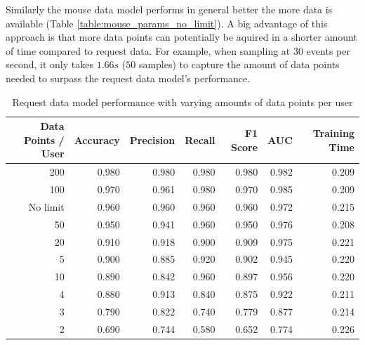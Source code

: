 \documentclass[
    fontsize=12pt,
    headings=small,
    parskip=half,           %
    bibliography=totoc,
    numbers=noenddot,       %
    open=any,               %
    final,                   %
    table
]{scrreprt}
\begin{document}
Similarly the mouse data model performs in general better the more data is available (Table \ref{table:mouse_params_no_limit}). A big advantage of this approach is that more data points can potentially be aquired in a shorter amount of time compared to request data. For example, when sampling at $30$ events per second, it only takes $1.66s$ ($50$ samples) to capture the amount of data points needed to surpass the request data model's performance.


\begin{table}
    \begin{center}
        \begin{tabular}{rrrrrrr}
            \toprule
            Data Points / User & Accuracy & Precision & Recall & F1 Score & AUC & Training Time \\
            \midrule
            200 & 0.980 & 0.980 & 0.980 & 0.980 & 0.982 & 0.209 \\
            100 & 0.970 & 0.961 & 0.980 & 0.970 & 0.985 & 0.209 \\
            No limit & 0.960 & 0.960 & 0.960 & 0.960 & 0.972 & 0.215 \\
            50 & 0.950 & 0.941 & 0.960 & 0.950 & 0.976 & 0.208 \\
            20 & 0.910 & 0.918 & 0.900 & 0.909 & 0.975 & 0.221 \\
            5 & 0.900 & 0.885 & 0.920 & 0.902 & 0.945 & 0.220 \\
            10 & 0.890 & 0.842 & 0.960 & 0.897 & 0.956 & 0.220 \\
            4 & 0.880 & 0.913 & 0.840 & 0.875 & 0.922 & 0.211 \\
            3 & 0.790 & 0.822 & 0.740 & 0.779 & 0.877 & 0.214 \\
            2 & 0.690 & 0.744 & 0.580 & 0.652 & 0.774 & 0.226 \\
            \bottomrule
        \end{tabular}
    \end{center}
    \caption{Request data model performance with varying amounts of data points per user}
    \label{table:request_params_no_limit}
\end{table}
\end{document}
